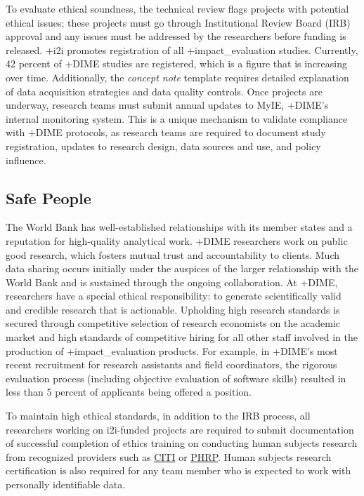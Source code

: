 \documentclass[
]{book}
\begin{document}
To evaluate ethical soundness, the technical review flags projects with potential ethical issues; these projects must go through Institutional Review Board (IRB) approval and any issues must be addressed by the researchers before funding is released. +i2i\textbar{} promotes registration of all +impact\_evaluation\textbar{} studies. Currently, 42 percent of +DIME\textbar{} studies are registered, which is a figure that is increasing over time. Additionally, the \emph{concept note} template requires detailed explanation of data acquisition strategies and data quality controls. Once projects are underway, research teams must submit annual updates to MyIE, +DIME\textbar's internal monitoring system. This is a unique mechanism to validate compliance with +DIME\textbar{} protocols, as research teams are required to document study registration, updates to research design, data sources and use, and policy influence.

\hypertarget{safe-people-7}{%
\subsection{Safe People}\label{safe-people-7}}

The World Bank has well-established relationships with its member states and a reputation for high-quality analytical work. +DIME\textbar{} researchers work on public good research, which fosters mutual trust and accountability to clients. Much data sharing occurs initially under the auspices of the larger relationship with the World Bank and is sustained through the ongoing collaboration. At +DIME\textbar, researchers have a special ethical responsibility: to generate scientifically valid and credible research that is actionable. Upholding high research standards is secured through competitive selection of research economists on the academic market and high standards of competitive hiring for all other staff involved in the production of +impact\_evaluation\textbar{} products. For example, in +DIME\textbar's most recent recruitment for research assistants and field coordinators, the rigorous evaluation process (including objective evaluation of software skills) resulted in less than 5 percent of applicants being offered a position.

To maintain high ethical standards, in addition to the IRB process, all researchers working on i2i-funded projects are required to submit documentation of successful completion of ethics training on conducting human subjects research from recognized providers such as \href{https://about.citiprogram.org/en/homepage/}{CITI} or \href{https://phrptraining.com/}{PHRP}. Human subjects research certification is also required for any team member who is expected to work with personally identifiable data.
\end{document}
